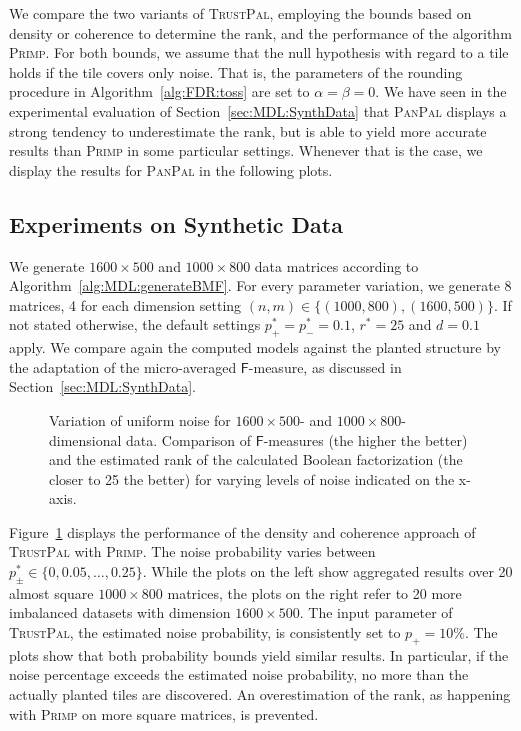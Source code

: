 We compare the two variants of \textsc{TrustPal}, employing the  bounds based on  density or coherence to determine the rank, and the performance of the algorithm \textsc{Primp}. For both bounds, we assume that the null hypothesis with regard to a tile holds if the tile covers only noise. That is, the parameters of the rounding procedure in Algorithm~\ref{alg:FDR:toss} are set to   $\alpha=\beta=0$. We have seen in the experimental evaluation of Section~\ref{sec:MDL:SynthData} that \textsc{PanPal} displays a strong tendency to underestimate the rank, but is able to yield more accurate results than \textsc{Primp} in some particular settings. Whenever that is the case, we display the results for \textsc{PanPal} in the following plots. 
\subsection{Experiments on Synthetic Data}
We generate $1600\times 500$ and $1000\times 800$ data matrices according to Algorithm~\ref{alg:MDL:generateBMF}. For every parameter variation, we generate 8 matrices, 4 for each dimension setting $(n,m)\in\{(1000,800),(1600,500)\}$. If not stated otherwise, the default settings $p_+^*=p_-^*=0.1$, $r^*=25$ and $d=0.1$ apply. 
We compare again the computed models against the planted structure by the adaptation of the micro-averaged $\mathsf{F}$-measure, as discussed in Section~\ref{sec:MDL:SynthData}.
\begin{figure}[t]
\centering

\caption{Variation of uniform noise for $1600\times 500$- and $1000\times 800$-dimensional data. Comparison of $\mathsf{F}$-measures (the higher the better) and the estimated rank of the calculated Boolean factorization (the closer to 25 the better) for varying levels of noise indicated on the x-axis.}
\label{fig:TP:noise}
\end{figure}

Figure~\ref{fig:TP:noise} displays the performance of the density and coherence approach of \textsc{TrustPal} with \textsc{Primp}. The noise probability varies between $p_\pm^*\in\{0,0.05,\ldots,0.25\}$. While the plots on the left show aggregated results over 20 almost square $1000\times 800$ matrices, the plots on the right refer to 20 more imbalanced datasets with dimension $1600\times 500$. The input parameter of \textsc{TrustPal}, the estimated noise probability, is consistently set to $p_+=10\%$. The plots show that both probability bounds yield similar results. In particular, if the noise percentage exceeds the estimated noise probability, no more than the actually planted tiles are discovered. An overestimation of the rank, as happening with \textsc{Primp} on more square matrices, is prevented. 

